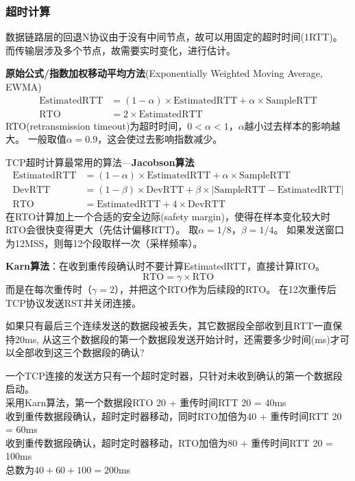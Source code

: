 \subsubsection{超时计算}
数据链路层的回退N协议由于没有中间节点，故可以用固定的超时时间(1RTT)。
而传输层涉及多个节点，故需要实时变化，进行估计。

\textbf{原始公式/指数加权移动平均方法}(Exponentially Weighted Moving Average, EWMA)
\[\begin{aligned}
    \text{EstimatedRTT} &= (1-\alpha)\times \text{EstimatedRTT} + \alpha \times \text{SampleRTT}\\
    \text{RTO} &= 2\times \text{EstimatedRTT}
\end{aligned}\]
RTO(retransmission timeout)为超时时间，$0<\alpha<1$，$\alpha$越小过去样本的影响越大。
一般取值$\alpha=0.9$，这会使过去影响指数减少。

\myhline
TCP超时计算最常用的算法---\textbf{Jacobson算法}
\[\begin{aligned}
    \text{EstimatedRTT} &= (1-\alpha)\times \text{EstimatedRTT} + \alpha \times \text{SampleRTT}\\
    \text{DevRTT} &=(1-\beta)\times\text{DevRTT} + \beta\times|\text{SampleRTT}-\text{EstimatedRTT}|\\
    \text{RTO} &= \text{EstimatedRTT} + 4\times \text{DevRTT}
\end{aligned}\]
在RTO计算加上一个合适的安全边际(safety margin)，使得在样本变化较大时RTO会很快变得更大（先估计偏移RTT）。
取$\alpha=1/8$，$\beta = 1/4$。
如果发送窗口为12MSS，则每12个段取样一次（采样频率）。

\myhline
\textbf{Karn算法}：在收到重传段确认时不要计算EstimatedRTT，直接计算RTO。
\[\text{RTO} = \gamma\times\text{RTO}\]
而是在每次重传时（$\gamma=2$），并把这个RTO作为后续段的RTO。
在12次重传后TCP协议发送RST并关闭连接。

\begin{example}
    如果只有最后三个连续发送的数据段被丢失，其它数据段全部收到且RTT一直保持20ms, 从这三个数据段的第一个数据段发送开始计时，还需要多少时间(ms)才可以全部收到这三个数据段的确认?
\end{example}
\begin{analysis}
    一个TCP连接的发送方只有一个超时定时器，只针对未收到确认的第一个数据段启动。\\
    采用Karn算法，第一个数据段RTO 20 + 重传时间RTT 20 = 40ms\\
    收到重传数据段确认，超时定时器移动，同时RTO加倍为40 + 重传时间RTT 20 = 60ms\\
    收到重传数据段确认，超时定时器移动，RTO加倍为80 + 重传时间RTT 20 = 100ms\\
    总数为$40+60+100=200$ms
\end{analysis}

